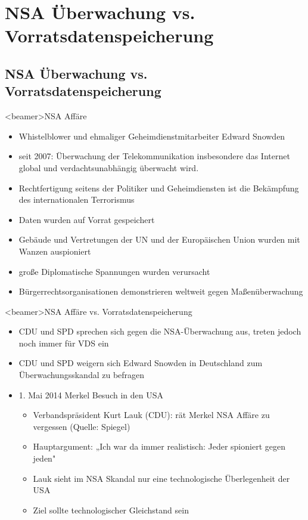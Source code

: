 \section{NSA Überwachung vs. Vorratsdatenspeicherung}
  \subsection{NSA Überwachung vs. Vorratsdatenspeicherung}
    \begin{frame}<beamer>{NSA Affäre}
      \begin{itemize}
        \item  Whistelblower und ehmaliger Geheimdienstmitarbeiter Edward Snowden 
        \item  seit 2007: Überwachung der Telekommunikation insbesondere  das Internet global und verdachtsunabhängig überwacht wird.
        \item  Rechtfertigung seitens der Politiker und Geheimdiensten ist die Bekämpfung des internationalen Terrorismus
        \item  Daten wurden auf Vorrat gespeichert
        \item  Gebäude und Vertretungen der UN und der Europäischen Union wurden mit Wanzen auspioniert
        \item  große Diplomatische Spannungen wurden verursacht
        \item  Bürgerrechtsorganisationen demonstrieren weltweit gegen Maßenüberwachung
      \end{itemize}
    \end{frame}
    \begin{frame}<beamer>{NSA Affäre vs. Vorratsdatenspeicherung}
      \begin{itemize}
        \item CDU und SPD sprechen sich gegen die NSA-Überwachung aus, treten jedoch noch immer für VDS ein
        \item CDU und SPD weigern sich Edward Snowden in Deutschland zum Überwachungsskandal zu befragen 
        \item 1. Mai 2014 Merkel Besuch in den USA
         \begin{itemize}
          \item Verbandspräsident Kurt Lauk (CDU): rät Merkel NSA Affäre zu vergessen (Quelle: Spiegel)
          \item Hauptargument: „Ich war da immer realistisch: Jeder spioniert gegen jeden"
          \item Lauk sieht im NSA Skandal nur eine technologische Überlegenheit der USA
          \item Ziel sollte technologischer Gleichstand sein
            \end{itemize}
      \end{itemize}
    \end{frame}
